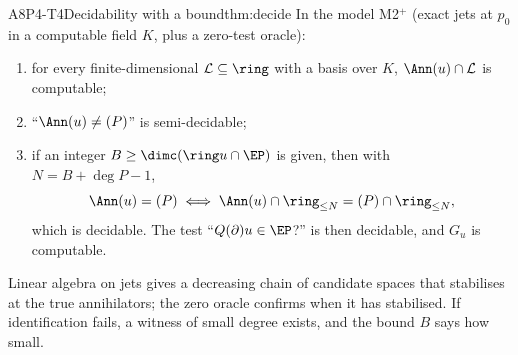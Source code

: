 \begin{dimcard}{A8}{P4-T4}{Decidability with a bound}{\proved}{thm:decide}
In the model M2$^+$ (exact jets at $p_0$ in a computable field $K$, plus a zero-test oracle):
\begin{enumerate}[label=(\roman*)]
\item for every finite-dimensional $\mathcal L\subseteq\ring$ with a basis over $K$, $\Ann(u)\cap\mathcal L$ is computable;
\item ``$\Ann(u)\ne(P)$'' is semi-decidable;
\item if an integer $B\ge\dimc(\ring u\cap\EP)$ is given, then with $N=B+\deg P-1$,
\[
\Ann(u)=(P)\iff\Ann(u)\cap\ring_{\le N}=(P)\cap\ring_{\le N},
\]
which is decidable. The test ``$Q(\partial)u\in\EP$?'' is then decidable, and $G_u$ is computable.
\end{enumerate}
\end{dimcard}

\begin{proofidea}
Linear algebra on jets gives a decreasing chain of candidate spaces that stabilises at the true annihilators; the zero oracle confirms when it has stabilised. If identification fails, a witness of small degree exists, and the bound $B$ says how small.
\end{proofidea}

